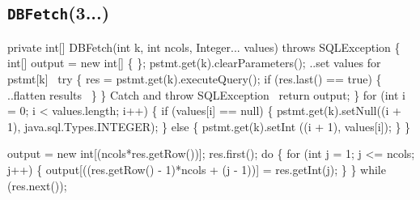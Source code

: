 \documentclass{article}
\def\nwendcode{\endtrivlist \endgroup}
\let\nwdocspar=\par
\theoremstyle{definition}
\begin{document}
\subsection{{\tt{}\protect{}DBFetch}(3...)}
\nwenddocs{}\endmoddef{}
private int[] DBFetch(int k, int ncols, Integer... values) throws SQLException \{
  int[] output = new int[] \{ \};
  pstmt.get(k).clearParameters();
  \LA{}..set values for \code{}pstmt[k]\edoc{}~{\nwtagstyle{}}\RA{}
  try \{
    res = pstmt.get(k).executeQuery();
    if (res.last() == true) \{
      \LA{}..flatten results~{\nwtagstyle{}}\RA{}
    \}
  \}
  \LA{}Catch and throw \code{}SQLException\edoc{}~{\nwtagstyle{}}\RA{}
  return output;
\}
\eatline
{}\nwendcode{}\endmoddef{}
for (int i = 0; i < values.length; i++) \{
  if (values[i] == null) \{
    pstmt.get(k).setNull((i + 1), java.sql.Types.INTEGER);
  \} else \{
    pstmt.get(k).setInt ((i + 1), values[i]);
  \}
\}
\nwendcode{}\nwdocspar
\nwenddocs{}\endmoddef{}
output = new int[(ncols*res.getRow())];
res.first();
do \{
  for (int j = 1; j <= ncols; j++) \{
    output[((res.getRow() - 1)*ncols + (j - 1))] = res.getInt(j);
  \}
\} while (res.next());
\nwendcode{}\nwdocspar
\end{document}
